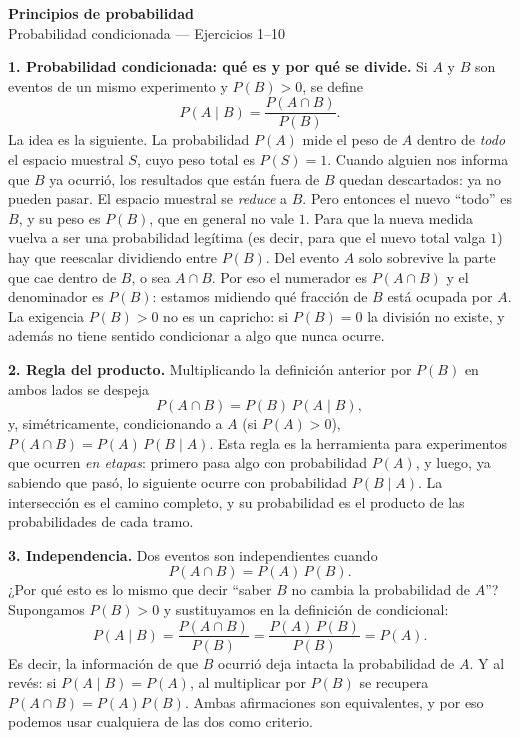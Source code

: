 \documentclass[11pt]{article}
\begin{document}
\begin{center}{\LARGE\bfseries Principios de probabilidad}\\[2pt]{\large Probabilidad condicionada --- Ejercicios 1--10}\end{center}

\vspace{1em}

\begin{teo}
\textbf{1. Probabilidad condicionada: qué es y por qué se divide.}
Si $A$ y $B$ son eventos de un mismo experimento y $P(B)>0$, se define
\[
P(A\mid B)=\frac{P(A\cap B)}{P(B)}.
\]
La idea es la siguiente. La probabilidad $P(A)$ mide el peso de $A$ dentro de \emph{todo} el espacio muestral $S$, cuyo peso total es $P(S)=1$. Cuando alguien nos informa que $B$ ya ocurrió, los resultados que están fuera de $B$ quedan descartados: ya no pueden pasar. El espacio muestral se \emph{reduce} a $B$. Pero entonces el nuevo ``todo'' es $B$, y su peso es $P(B)$, que en general no vale $1$. Para que la nueva medida vuelva a ser una probabilidad legítima (es decir, para que el nuevo total valga $1$) hay que reescalar dividiendo entre $P(B)$. Del evento $A$ solo sobrevive la parte que cae dentro de $B$, o sea $A\cap B$. Por eso el numerador es $P(A\cap B)$ y el denominador es $P(B)$: estamos midiendo qué fracción de $B$ está ocupada por $A$. La exigencia $P(B)>0$ no es un capricho: si $P(B)=0$ la división no existe, y además no tiene sentido condicionar a algo que nunca ocurre.

\medskip
\textbf{2. Regla del producto.}
Multiplicando la definición anterior por $P(B)$ en ambos lados se despeja
\[
P(A\cap B)=P(B)\,P(A\mid B),
\]
y, simétricamente, condicionando a $A$ (si $P(A)>0$), $P(A\cap B)=P(A)\,P(B\mid A)$. Esta regla es la herramienta para experimentos que ocurren \emph{en etapas}: primero pasa algo con probabilidad $P(A)$, y luego, ya sabiendo que pasó, lo siguiente ocurre con probabilidad $P(B\mid A)$. La intersección es el camino completo, y su probabilidad es el producto de las probabilidades de cada tramo.

\medskip
\textbf{3. Independencia.}
Dos eventos son independientes cuando
\[
P(A\cap B)=P(A)\,P(B).
\]
¿Por qué esto es lo mismo que decir ``saber $B$ no cambia la probabilidad de $A$''? Supongamos $P(B)>0$ y sustituyamos en la definición de condicional:
\[
P(A\mid B)=\frac{P(A\cap B)}{P(B)}=\frac{P(A)\,P(B)}{P(B)}=P(A).
\]
Es decir, la información de que $B$ ocurrió deja intacta la probabilidad de $A$. Y al revés: si $P(A\mid B)=P(A)$, al multiplicar por $P(B)$ se recupera $P(A\cap B)=P(A)P(B)$. Ambas afirmaciones son equivalentes, y por eso podemos usar cualquiera de las dos como criterio.


\end{teo}
\end{document}
